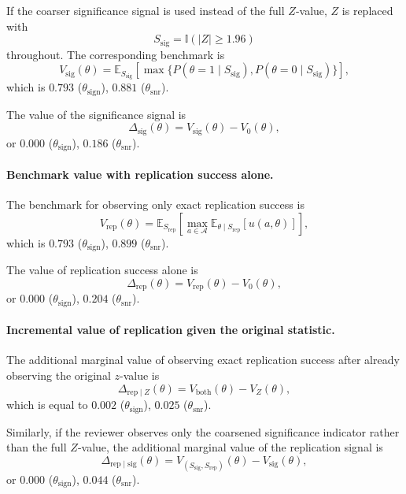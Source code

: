 If the coarser significance signal is used instead of the full \(Z\)-value, $Z$ is replaced with
\[
S_{\mathrm{sig}}=\mathbb{I}(|Z|\geq 1.96)
\]
throughout. The corresponding benchmark is
\[
V_{\mathrm{sig}}(\theta)
=
\mathbb{E}_{S_{\mathrm{sig}}}
\left[
\max\{
P(\theta=1\mid S_{\mathrm{sig}}),
P(\theta=0\mid S_{\mathrm{sig}})
\}
\right],
\]
which is $0.793$ ($\theta_{\mathrm{sign}}$), $0.881$ ($\theta_{\mathrm{snr}}$).

The value of the significance signal is 
\[
\Delta_{\mathrm{sig}}(\theta)
=
V_{\mathrm{sig}}(\theta)-V_0(\theta),
\]
or $0.000$ ($\theta_{\mathrm{sign}}$), $0.186$ ($\theta_{\mathrm{snr}}$).

\paragraph{Benchmark value with replication success alone.}
The benchmark for observing only exact replication success is
\[
V_{\mathrm{rep}}(\theta)
=
\mathbb{E}_{S_{\mathrm{rep}}}
\left[
\max_{a\in\mathcal{A}}
\mathbb{E}_{\theta\mid S_{\mathrm{rep}}}[u(a,\theta)]
\right],
\]
which is $0.793$ ($\theta_{\mathrm{sign}}$), $0.899$ ($\theta_{\mathrm{snr}}$).

The value of replication success alone is
\[
\Delta_{\mathrm{rep}}(\theta)
=
V_{\mathrm{rep}}(\theta)-V_0(\theta),
\]
or $0.000$ ($\theta_{\mathrm{sign}}$), $0.204$ ($\theta_{\mathrm{snr}}$).

\paragraph{Incremental value of replication given the original statistic.}
The additional marginal value of observing exact replication success after already observing the original $z$-value is
\[
\Delta_{\mathrm{rep}\mid Z}(\theta)
=
V_{\mathrm{both}}(\theta)-V_Z(\theta),
\]
which is equal to $0.002$ ($\theta_{\mathrm{sign}}$), $0.025$ ($\theta_{\mathrm{snr}}$).

Similarly, if the reviewer observes only the coarsened significance indicator rather than the full \(Z\)-value, the additional marginal value of the replication signal is
\[
\Delta_{\mathrm{rep}\mid \mathrm{sig}}(\theta)
=
V_{(S_{\mathrm{sig}},S_{\mathrm{rep}})}(\theta)
-
V_{\mathrm{sig}}(\theta),
\]
or $0.000$ ($\theta_{\mathrm{sign}}$), $0.044$ ($\theta_{\mathrm{snr}}$).
